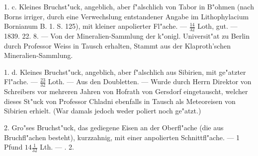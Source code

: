 \documentclass[a4paper, 11pt, oneside, polutonikogreek, german]{article}
\begin{document}
1. c. Kleines Bruchst"uck, angeblich, aber f"alschlich von Tabor in B"ohmen (nach Borns irriger, durch eine Verwechslung entstandener Angabe im Lithophylacium Bornianum B. 1. S. 125), mit kleiner anpolierter Fl"ache. --- $\frac{14}{32}$ Loth, gut. --- 1839. 22. 8. --- Von der Mineralien-Sammlung der k"onigl. Universit"at zu Berlin durch Professor Weiss in Tausch erhalten, Stammt aus der Klaproth'schen Mineralien-Sammlung.

1. d. Kleines Bruchst"uck, angeblich, aber f"alschlich aus Sibirien, mit ge"atzter Fl"ache. --- $\frac{23}{32}$ Loth. --- Aus den Doubletten. --- Wurde durch Herrn Direktor von Schreibers vor mehreren Jahren von Hofrath von Gersdorf eingetauscht, welcher dieses St"uck von Professor Chladni ebenfalls in Tausch als Meteoreisen von Sibirien erhielt. (War damals jedoch weder poliert noch ge"atzt.)

2. Gro"ses Bruchst"uck, das gediegene Eisen an der Oberfl"ache (die aus Bruchfl"achen besteht), kurzzahnig, mit einer anpolierten Schnittfl"ache. --- 1 Pfund $14\frac{1}{32}$ Lth. --- . 2.

\setlength{\leftskip}{10mm}
\setlength{\parindent}{0pt}
\end{document}
